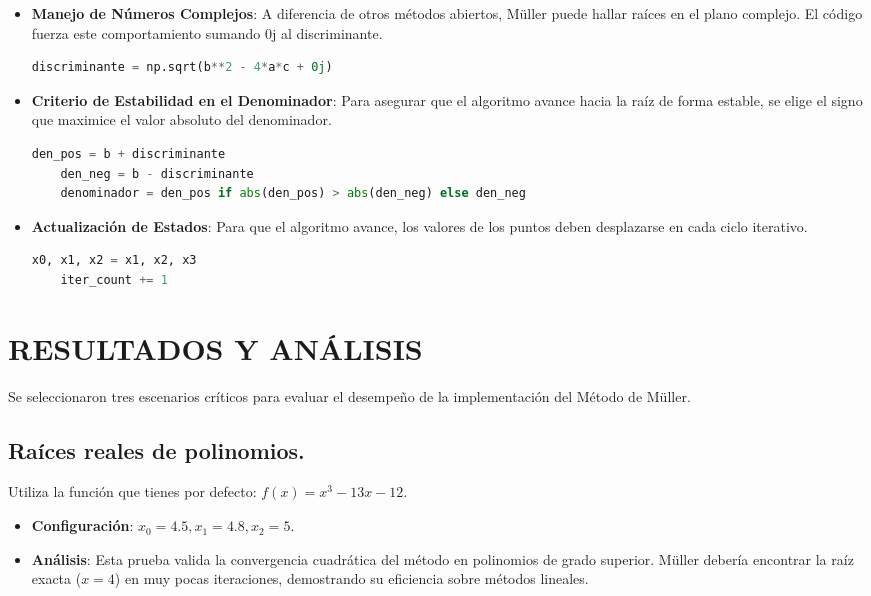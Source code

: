 \documentclass{rmf-d}
\begin{document}
\begin{multicols}{2}
\begin{itemize}
    \item \textbf{Manejo de Números Complejos}: A diferencia de otros métodos abiertos, Müller puede hallar raíces en el plano complejo. El código fuerza este comportamiento sumando 0j al discriminante.
    \begin{lstlisting}[language=Python, caption=Implementación del discriminante con soporte para números imaginarios.]
    discriminante = np.sqrt(b**2 - 4*a*c + 0j)
    \end{lstlisting}

    \item\textbf{Criterio de Estabilidad en el Denominador}: Para asegurar que el algoritmo avance hacia la raíz de forma estable, se elige el signo que maximice el valor absoluto del denominador.
    \begin{lstlisting}[language=Python, caption=Optimización del denominador para evitar errores de redondeo y maximizar la convergencia.]
    den_pos = b + discriminante
    den_neg = b - discriminante
    denominador = den_pos if abs(den_pos) > abs(den_neg) else den_neg
    \end{lstlisting}

    \item \textbf{Actualización de Estados}: Para que el algoritmo avance, los valores de los puntos deben desplazarse en cada ciclo iterativo.
    \begin{lstlisting}[language=Python, caption=Desplazamiento de puntos para la siguiente iteración.]
    x0, x1, x2 = x1, x2, x3
    iter_count += 1
    \end{lstlisting}
    
    
\end{itemize}




















\section{RESULTADOS Y ANÁLISIS}
\label{sec:4}
Se seleccionaron tres escenarios críticos para evaluar el desempeño de la implementación del Método de Müller.

\subsection{Raíces reales de polinomios.}
Utiliza la función que tienes por defecto: $f(x) = x^3 - 13x - 12$.
\begin{itemize}
    \item\textbf{Configuración}: $x_0 = 4.5, x_1 = 4.8, x_2 = 5$.
    \item\textbf{Análisis}: Esta prueba valida la convergencia cuadrática del método en polinomios de grado superior. Müller debería encontrar la raíz exacta ($x = 4$) en muy pocas iteraciones, demostrando su eficiencia sobre métodos lineales.
\end{itemize}


\end{multicols}
\end{document}
